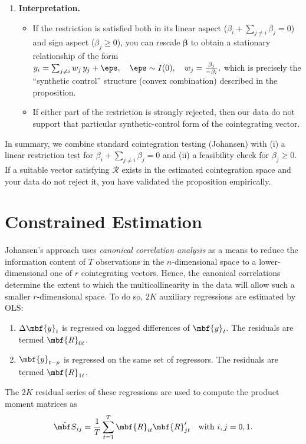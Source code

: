 \begin{enumerate}
    \item \textbf{Interpretation.}
    \begin{itemize}
        \item If the restriction is satisfied both in its linear aspect ($\beta_i + \sum_{j\neq i}\beta_j=0$) and sign aspect ($\beta_j \ge 0$), you can rescale 
        $\boldsymbol{\beta}$ to obtain a stationary relationship of the form
        $
            y_i = \sum_{j\neq i} w_j\,y_j + \eps, 
            \quad \eps \sim I(0),
            \quad w_j = \frac{\beta_j}{-\beta_i},
        $
        which is precisely the ``synthetic control'' structure (convex combination) described in the proposition.
        \item If either part of the restriction is strongly rejected, then our data do not support that particular synthetic-control form of the cointegrating vector.
    \end{itemize}
\end{enumerate}

In summary, we combine standard cointegration testing (Johansen) with (i) a linear restriction test for 
$\beta_i + \sum_{j\neq i} \beta_j=0$ and (ii) a feasibility check for 
$\beta_j \ge 0$. If a suitable vector satisfying $\mathcal{R}$ exists in the estimated cointegration space and your data do not reject it, you have validated the proposition empirically.



\section{Constrained Estimation}

Johansen's approach uses \textit{canonical correlation analysis} as a means to re\-duce the information content of $T$ observations in the $n$-dimensional space to a lower-dimensional one of $r$ cointegrating vectors. Hence, the canonical correlations determine the extent to which the multicollinearity in the data will allow such a smaller $r$-dimensional space. To do so, $2K$ auxiliary regressions are estimated by OLS: 
\begin{enumerate}
\item $\Delta\mbf{y}_t$ is regressed on lagged differences of $\mbf{y}_t$. The residuals are termed $\mbf{R}_{0t}$. 
\item $\mbf{y}_{t-p}$ is regressed on the same set of regressors. The residuals are termed $\mbf{R}_{1t}$. 
\end{enumerate}
The $2K$ residual series of these regressions are used to compute the product moment matrices as
$$
\hat{\mbf S}_{ij} = \frac{1}{T}\sum_{t=1}^T \mbf{R}_{it}\mbf{R}'_{jt} \quad \text{with } i,j = 0,1.
$$

